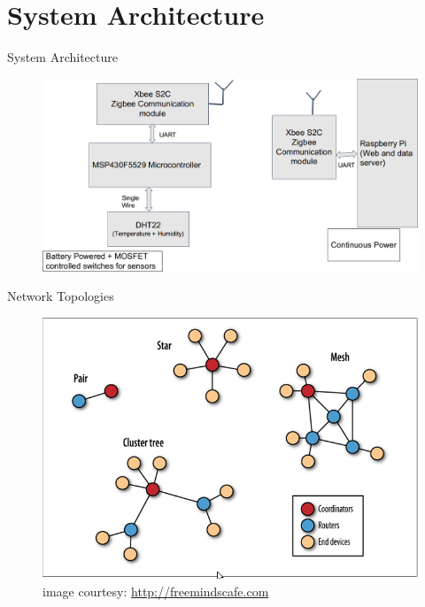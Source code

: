 \documentclass[t]{beamer} %
\begin{document}
\section{System Architecture}
\begin{frame}{System Architecture}

\begin{figure}[!ht]
	\centering
\includegraphics[scale=0.35]{sys_archi}
\label{fig:sys_archi}
\end{figure}

\end{frame}

\begin{frame}{Network Topologies}
\begin{figure}[!ht]
	\centering
\includegraphics[scale=0.4]{xbee_topologies}
\caption{\tiny image courtesy: \url{http://freemindscafe.com}}
\label{fig:topology}
\end{figure}
\end{frame}
\end{document}
